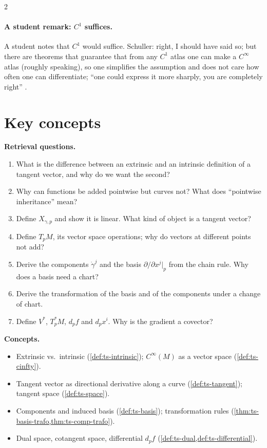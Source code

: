 \begin{paracol}{2}
\paragraph{A student remark: $C^1$ suffices.} A student notes that $C^1$ would suffice. Schuller: right, I should have said
so; but there are theorems that guarantee that from any $C^1$ atlas one can make a $C^\infty$ atlas (roughly speaking), so one
simplifies the assumption and does not care how often one can differentiate; ``one could express it more sharply, you are
completely right'' .

\section*{Key concepts}
\begin{keyconcepts}
\textbf{Retrieval questions.}
\begin{enumerate}
  \item What is the difference between an extrinsic and an intrinsic definition of a tangent vector, and why do we want the second?
  \item Why can functions be added pointwise but curves not? What does ``pointwise inheritance'' mean?
  \item Define $X_{\gamma,p}$ and show it is linear. What kind of object is a tangent vector?
  \item Define $T_pM$, its vector space operations; why do vectors at different points not add?
  \item Derive the components $\dot\gamma^j$ and the basis $\partial/\partial x^j|_p$ from the chain rule. Why does a basis
        need a chart?
  \item Derive the transformation of the basis and of the components under a change of chart.
  \item Define $V^*$, $T_p^*M$, $d_pf$ and $d_px^i$. Why is the gradient a covector?
\end{enumerate}
\textbf{Concepts.}
\begin{itemize}
  \item Extrinsic vs.\ intrinsic (\cref{def:ts-intrinsic}); $C^\infty(M)$ as a vector space (\cref{def:ts-cinfty}).
  \item Tangent vector as directional derivative along a curve (\cref{def:ts-tangent}); tangent space (\cref{def:ts-space}).
  \item Components and induced basis (\cref{def:ts-basis}); transformation rules
        (\cref{thm:ts-basis-trafo,thm:ts-comp-trafo}).
  \item Dual space, cotangent space, differential $d_pf$ (\cref{def:ts-dual,def:ts-differential}).
\end{itemize}
\end{keyconcepts}

\flushside
\end{paracol}
